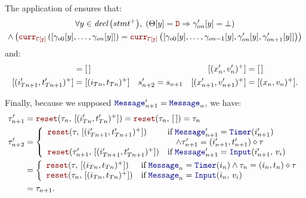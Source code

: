 \begin{skippableproof}
    The application of  ensures that:
    \begin{multline*}
        \forall y \in \declSet{stmt^+}, \; \left(\Theta[y] = \dType \Rightarrow \gamma'_{on}[y] = \bot\right) \\
        \wedge \left(\CurrVal{\tyCtx[y]}{[\gamma_{o0}[y], \dots, \gamma_{on}[y]]} = \CurrVal{\tyCtx[y]}{[\gamma_{o0}[y], \dots, \gamma_{on-1}[y], \gamma'_{on}[y], \gamma'_{on+1}[y]]}\right)
    \end{multline*}
    and:
    \begin{align*}
        [(i'_{Tn}, t'_{Tn})^+]     & = \emptylist           &          &           & [(x'_n, v'_n)^+]         & = \emptylist      \\
        [(i'_{Tn+1}, t'_{Tn+1})^+] & = [(i_{Tn}, t_{Tn})^+] & s'_{n+2} & = s_{n+1} & [(x'_{n+1}, v'_{n+1})^+] & = [(x_n, v_n)^+].
    \end{align*}

    Finally, because we supposed $\mess'_{n+1} = \mess_n$, we have:
    \begin{align*}
        \tau'_{n+1} & = \reset{\tau_n}{[(i'_{Tn}, t'_{Tn})^+]} = \reset{\tau_n}{\emptylist} = \tau_n \\
        \tau'_{n+2} & =
        \left\{
        \begin{array}{lll}
            \reset{\tau}{[(i'_{Tn+1}, t'_{Tn+1})^+]}        & \text{if} \; \mess'_{n+1} = \timerMess{i'_{n+1}}              \\
                                                            & \quad \wedge \tau'_{n+1} = (i'_{n+1}, t'_{n+1}) \diamond \tau \\
            \reset{\tau'_{n+1}}{[(i'_{Tn+1}, t'_{Tn+1})^+]} & \text{if} \; \mess'_{n+1} = \inputMess{i'_{n+1}}{v_i}
        \end{array}
        \right.                                                                                      \\
                    & =
        \left\{
        \begin{array}{lll}
            \reset{\tau}{[(i_{Tn}, t_{Tn})^+]}   & \text{if} \; \mess_n = \timerMess{i_n} \wedge \tau_n = (i_n, t_n) \diamond \tau \\
            \reset{\tau_n}{[(i_{Tn}, t_{Tn})^+]} & \text{if} \; \mess_n = \inputMess{i_n}{v_i}
        \end{array}
        \right.                                                                                      \\
                    & = \tau_{n+1}.
    \end{align*}
\end{skippableproof}

